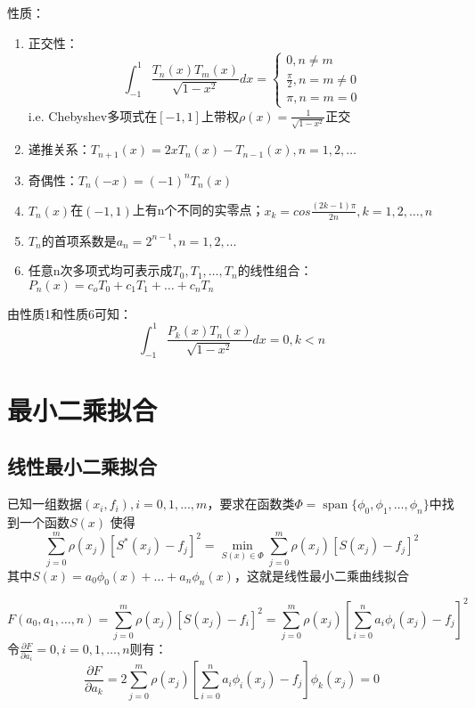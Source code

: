\documentclass[a4paper]{article}
\DeclareMathOperator{\spn}{span}
\begin{document}
性质：
\begin{enumerate}
    \item 正交性：
    $$\int^1_{-1} \frac{T_n(x)T_m(x)}{\sqrt{1-x^2}}dx = \left\{
        \begin{array}{lr}
            0, n \neq m \\
            \frac{\pi}{2}, n=m \neq 0 \\
            \pi, n=m=0
        \end{array}
        \right. $$
        i.e. Chebyshev多项式在$[-1,1]$上带权$\rho(x) = \frac{1}{\sqrt{1-x^2}}$正交
    \item 递推关系：$T_{n+1}(x) =2xT_n(x)-T_{n-1}(x), n=1,2,\dots $
    \item 奇偶性：$T_n(-x) = (-1)^nT_n(x) $
    \item $T_n(x)$在$(-1,1)$上有n个不同的实零点；$x_k = cos\frac{(2k-1)\pi}{2n}, k=1,2,\dots,n$
    \item $T_n$的首项系数是$a_n = 2^{n-1},n=1,2,\dots$
    \item 任意n次多项式均可表示成$T_0, T_1, \dots, T_n$的线性组合：$P_n(x) = c_oT_0 + c_1T_1 + \dots + c_nT_n$      
\end{enumerate}

由性质1和性质6可知：
$$\int^1_{-1}\frac{P_k(x)T_n(x)}{\sqrt{1-x^2}}dx = 0, k < n$$

\section{最小二乘拟合}

\subsection{线性最小二乘拟合}
已知一组数据$(x_i, f_i), i=0,1,\dots, m$，要求在函数类$\Phi = \spn\{\phi_0, \phi_1, \dots, \phi_n\}$中找到一个函数$S(x)$
使得
\begin{equation}
    \sum^m_{j=0}\rho(x_j)[S^*(x_j)-f_j]^2=\min_{S(x)\in\Phi}\sum^m_{j=0}\rho(x_j)[S(x_j)-f_j]^2 
\end{equation}
其中$S(x)=a_0\phi_0(x)+\dots + a_n\phi_n(x)$，这就是线性最小二乘曲线拟合

\begin{equation*}
    F(a_0, a_1, \dots, n) = \sum^m_{j=0}\rho(x_j)[S(x_j)-f_i]^2 = \sum^m_{j=0}\rho(x_j)[\sum^n_{i=0}a_i\phi_i(x_j)-f_j]^2
\end{equation*}
令$\frac{\partial F}{\partial a_i} = 0, i=0,1,\dots, n$则有：
\begin{equation}
    \frac{\partial F}{\partial a_k} = 2\sum^m_{j=0}\rho(x_j)[\sum^n_{i=0}a_i\phi_i(x_j)-f_j]\phi_k(x_j) = 0  
    \label{eq:2.2}
\end{equation}
\end{document}
